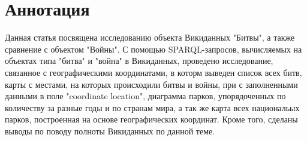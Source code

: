 \section{Аннотация}

Данная статья посвящена исследованию объекта Викиданных "Битвы", а также сравнение с объектом "Войны". С помощью SPARQL-запросов, вычисляемых на объектах типа "битва" и "война" в Викиданных, проведено исследование, связанное с географическими координатами, в которм выведен список всех битв, карты с местами, на которых происходили битвы и войны, при с заполненными данными в поле "coordinate location", диаграмма парков, упорядоченных по количеству за разные годы и по странам мира, а так же карта всех национальых парков, построенная на основе географических координат. Кроме того, сделаны выводы по поводу полноты Викиданных по данной теме.